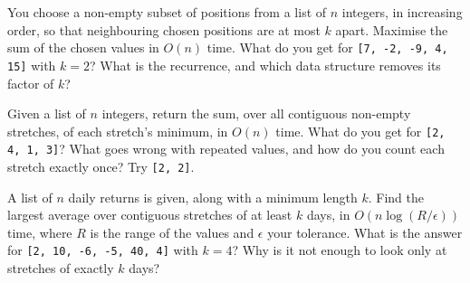 \begin{question}\label{iq:iv3:algorithms:78}
You choose a non-empty subset of positions from a list of $n$ integers, in increasing order, so that neighbouring chosen positions are at most $k$ apart. Maximise the sum of the chosen values in $O(n)$ time. What do you get for \texttt{[7, -2, -9, 4, 15]} with $k = 2$? What is the recurrence, and which data structure removes its factor of $k$?
\end{question}

\begin{question}\label{iq:iv3:algorithms:79}
Given a list of $n$ integers, return the sum, over all contiguous non-empty stretches, of each stretch's minimum, in $O(n)$ time. What do you get for \texttt{[2, 4, 1, 3]}? What goes wrong with repeated values, and how do you count each stretch exactly once? Try \texttt{[2, 2]}.
\end{question}

\begin{question}\label{iq:iv3:algorithms:80}
A list of $n$ daily returns is given, along with a minimum length $k$. Find the largest average over contiguous stretches of at least $k$ days, in $O(n \log(R/\epsilon))$ time, where $R$ is the range of the values and $\epsilon$ your tolerance. What is the answer for \texttt{[2, 10, -6, -5, 40, 4]} with $k = 4$? Why is it not enough to look only at stretches of exactly $k$ days?
\end{question}
